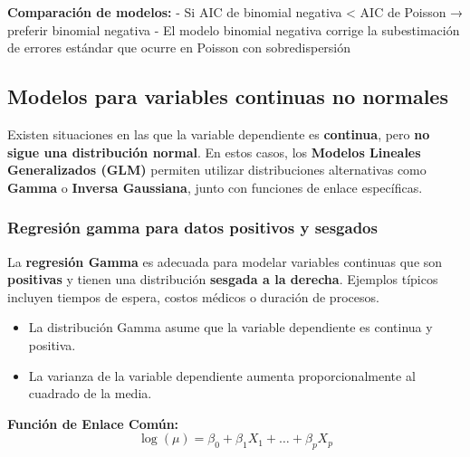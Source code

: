 \documentclass[
  letterpaper,
  DIV=11,
  numbers=noendperiod]{scrreprt}
\providecommand{\tightlist}{%
  \setlength{\itemsep}{0pt}\setlength{\parskip}{0pt}}
\begin{document}
\textbf{Comparación de modelos:} - Si AIC de binomial negativa
\textless{} AIC de Poisson → preferir binomial negativa - El modelo
binomial negativa corrige la subestimación de errores estándar que
ocurre en Poisson con sobredispersión

\subsection{Modelos para variables continuas no
normales}\label{modelos-para-variables-continuas-no-normales}

Existen situaciones en las que la variable dependiente es
\textbf{continua}, pero \textbf{no sigue una distribución normal}. En
estos casos, los \textbf{Modelos Lineales Generalizados (GLM)} permiten
utilizar distribuciones alternativas como \textbf{Gamma} o
\textbf{Inversa Gaussiana}, junto con funciones de enlace específicas.

\subsubsection{Regresión gamma para datos positivos y
sesgados}\label{regresiuxf3n-gamma-para-datos-positivos-y-sesgados}

La \textbf{regresión Gamma} es adecuada para modelar variables continuas
que son \textbf{positivas} y tienen una distribución \textbf{sesgada a
la derecha}. Ejemplos típicos incluyen tiempos de espera, costos médicos
o duración de procesos.

\begin{itemize}
\tightlist
\item
  La distribución Gamma asume que la variable dependiente es continua y
  positiva.
\item
  La varianza de la variable dependiente aumenta proporcionalmente al
  cuadrado de la media.
\end{itemize}

\textbf{Función de Enlace Común:}
\[\log(\mu) = \beta_0 + \beta_1 X_1 + \dots + \beta_p X_p\]
\end{document}
